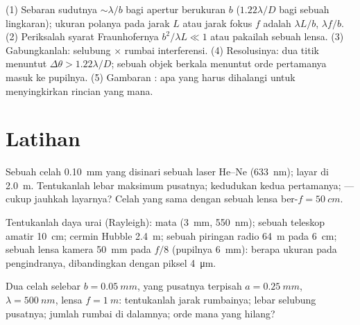 \begin{method}\label{met:b2:diffraction:method}
(1) Sebaran sudutnya $\sim\lambda/b$ bagi apertur berukuran $b$ ($1.22\lambda/D$ bagi
sebuah lingkaran); ukuran polanya pada jarak $L$ atau jarak fokus $f$ adalah
$\lambda L/b$, $\lambda f/b$. (2) Periksalah syarat Fraunhofernya $b^2/\lambda L \ll 1$ atau
pakailah sebuah lensa. (3) Gabungkanlah: selubung  $\times$ rumbai
interferensi. (4) Resolusinya: dua titik menuntut $\Delta\theta > 1.22\lambda/D$; sebuah objek
berkala menuntut orde pertamanya masuk ke pupilnya. (5) Gambaran : apa yang harus dihalangi untuk menyingkirkan rincian yang mana.
\end{method}

\section{Latihan}

\begin{exercise}[$\star$]\label{exo:b2:diffraction:1}
Sebuah celah \qty{0.10}{mm} yang disinari sebuah laser He--Ne (\qty{633}{nm}); layar di
\qty{2.0}{m}. Tentukanlah lebar maksimum pusatnya; kedudukan kedua  pertamanya;  --- cukup jauhkah layarnya? Celah
yang sama dengan sebuah lensa ber-$f = \qty{50}{cm}$.
\end{exercise}

\begin{exercise}[$\star$]\label{exo:b2:diffraction:2}
Tentukanlah daya urai (Rayleigh): mata (\qty{3}{mm}, \qty{550}{nm}); sebuah
teleskop amatir \qty{10}{cm}; cermin Hubble \qty{2.4}{m}; sebuah piringan radio
\qty{64}{m} pada \qty{6}{cm}; sebuah lensa kamera \qty{50}{mm} pada $f/8$ (pupilnya \qty{6}{mm}):
berapa ukuran  pada pengindranya, dibandingkan dengan piksel \qty{4}{\micro m}.
\end{exercise}

\begin{exercise}[$\star$]\label{exo:b2:diffraction:3}
Dua celah selebar $b = \qty{0.05}{mm}$, yang pusatnya terpisah $a = \qty{0.25}{mm}$, $\lambda =
\qty{500}{nm}$, lensa $f = \qty{1}{m}$: tentukanlah jarak rumbainya; lebar selubung
pusatnya; jumlah rumbai di dalamnya; orde mana yang hilang?
\end{exercise}

